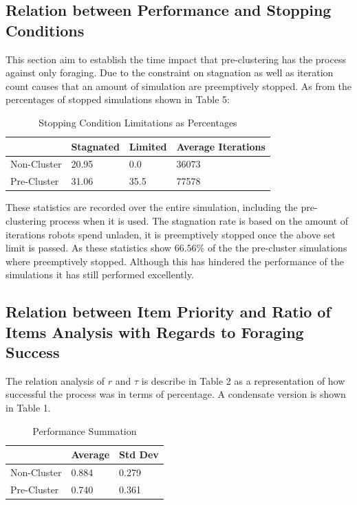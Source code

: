 \documentclass[12pt]{article}
\begin{document}
\subsection{Relation between Performance and Stopping Conditions}

\par{This section aim to establish the time impact that pre-clustering has the process against only foraging. Due to the constraint on stagnation as well as iteration count causes that an amount of simulation are preemptively stopped. As from the percentages of stopped simulations shown in Table 5:}

\begin{table}[h]
\centering
\begin{tabular}{|l|l|l|l|}
\hline
            & Stagnated & Limited & Average Iterations \\ \hline
Non-Cluster & 20.95     & 0.0     & 36073              \\ \hline
Pre-Cluster & 31.06     & 35.5    & 77578              \\ \hline
\end{tabular}
\caption{Stopping Condition Limitations as Percentages}
\label{my-label}
\end{table}

\par{These statistics are recorded over the entire simulation, including the pre-clustering process when it is used. The stagnation rate is based on the amount of iterations robots spend unladen, it is preemptively stopped once the above set limit is passed. As these statistics show $66.56\%$ of the the pre-cluster simulations where preemptively stopped. Although this has hindered the performance of the simulations it has still performed excellently.}

\subsection{Relation between Item Priority and Ratio of Items Analysis with Regards to Foraging Success}
\par{The relation analysis of $r$ and $\tau$ is describe in Table 2 as a representation of how successful the process was in terms of percentage. A condensate version is shown in Table 1.}

\begin{table}[h]
\centering
\begin{tabular}{|l|l|l|}
\hline
            & Average & Std Dev \\ \hline
Non-Cluster & 0.884   & 0.279   \\ \hline
Pre-Cluster & 0.740   & 0.361   \\ \hline
\end{tabular}
\caption{Performance Summation}
\label{my-label}
\end{table}
\end{document}
